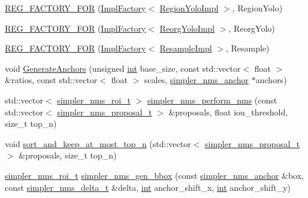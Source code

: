 \begin{DoxyCompactItemize}
\item 
\hyperlink{namespaceInferenceEngine_1_1Extensions_1_1Cpu_a4aaece33ff2e0b60676f2f5e6ca87b1e}{R\+E\+G\+\_\+\+F\+A\+C\+T\+O\+R\+Y\+\_\+\+F\+OR} (\hyperlink{classInferenceEngine_1_1Extensions_1_1Cpu_1_1ImplFactory}{Impl\+Factory}$<$ \hyperlink{classInferenceEngine_1_1Extensions_1_1Cpu_1_1RegionYoloImpl}{Region\+Yolo\+Impl} $>$, Region\+Yolo)
\item 
\hyperlink{namespaceInferenceEngine_1_1Extensions_1_1Cpu_a2fa9bbc3532e40ebe957267edb5b90b6}{R\+E\+G\+\_\+\+F\+A\+C\+T\+O\+R\+Y\+\_\+\+F\+OR} (\hyperlink{classInferenceEngine_1_1Extensions_1_1Cpu_1_1ImplFactory}{Impl\+Factory}$<$ \hyperlink{classInferenceEngine_1_1Extensions_1_1Cpu_1_1ReorgYoloImpl}{Reorg\+Yolo\+Impl} $>$, Reorg\+Yolo)
\item 
\hyperlink{namespaceInferenceEngine_1_1Extensions_1_1Cpu_a221ef40fa5805c06f93b89c7d61e741e}{R\+E\+G\+\_\+\+F\+A\+C\+T\+O\+R\+Y\+\_\+\+F\+OR} (\hyperlink{classInferenceEngine_1_1Extensions_1_1Cpu_1_1ImplFactory}{Impl\+Factory}$<$ \hyperlink{classInferenceEngine_1_1Extensions_1_1Cpu_1_1ResampleImpl}{Resample\+Impl} $>$, Resample)
\item 
void \hyperlink{namespaceInferenceEngine_1_1Extensions_1_1Cpu_a372135d51e4474280774a7ca10933c84}{Generate\+Anchors} (unsigned \hyperlink{CMakeCache_8txt_a79a3d8790b2588b09777910863574e09}{int} base\+\_\+size, const std\+::vector$<$ float $>$ \&ratios, const std\+::vector$<$ float $>$ scales, \hyperlink{structInferenceEngine_1_1Extensions_1_1Cpu_1_1simpler__nms__anchor}{simpler\+\_\+nms\+\_\+anchor} $\ast$anchors)
\item 
std\+::vector$<$ \hyperlink{structInferenceEngine_1_1Extensions_1_1Cpu_1_1simpler__nms__roi__t}{simpler\+\_\+nms\+\_\+roi\+\_\+t} $>$ \hyperlink{namespaceInferenceEngine_1_1Extensions_1_1Cpu_a6cef0ac4faf74f33e53449ba39304914}{simpler\+\_\+nms\+\_\+perform\+\_\+nms} (const std\+::vector$<$ \hyperlink{structInferenceEngine_1_1Extensions_1_1Cpu_1_1simpler__nms__proposal__t}{simpler\+\_\+nms\+\_\+proposal\+\_\+t} $>$ \&proposals, float iou\+\_\+threshold, size\+\_\+t top\+\_\+n)
\item 
void \hyperlink{namespaceInferenceEngine_1_1Extensions_1_1Cpu_a9ab5785b0943b51af3a2668ae9df0e11}{sort\+\_\+and\+\_\+keep\+\_\+at\+\_\+most\+\_\+top\+\_\+n} (std\+::vector$<$ \hyperlink{structInferenceEngine_1_1Extensions_1_1Cpu_1_1simpler__nms__proposal__t}{simpler\+\_\+nms\+\_\+proposal\+\_\+t} $>$ \&proposals, size\+\_\+t top\+\_\+n)
\item 
\hyperlink{structInferenceEngine_1_1Extensions_1_1Cpu_1_1simpler__nms__roi__t}{simpler\+\_\+nms\+\_\+roi\+\_\+t} \hyperlink{namespaceInferenceEngine_1_1Extensions_1_1Cpu_aa02aa9d3ca8d6c473e44d1cd7d4f11dd}{simpler\+\_\+nms\+\_\+gen\+\_\+bbox} (const \hyperlink{structInferenceEngine_1_1Extensions_1_1Cpu_1_1simpler__nms__anchor}{simpler\+\_\+nms\+\_\+anchor} \&box, const \hyperlink{structInferenceEngine_1_1Extensions_1_1Cpu_1_1simpler__nms__delta__t}{simpler\+\_\+nms\+\_\+delta\+\_\+t} \&delta, \hyperlink{CMakeCache_8txt_a79a3d8790b2588b09777910863574e09}{int} anchor\+\_\+shift\+\_\+x, \hyperlink{CMakeCache_8txt_a79a3d8790b2588b09777910863574e09}{int} anchor\+\_\+shift\+\_\+y)

\end{DoxyCompactItemize}
